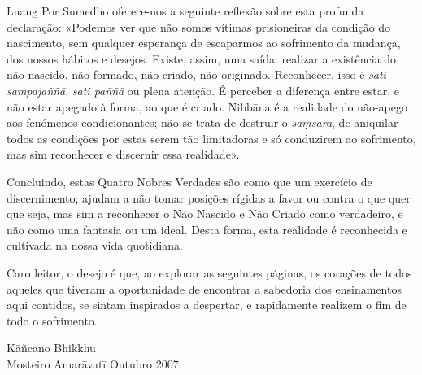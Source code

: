 Luang Por Sumedho oferece-nos a seguinte reflexão sobre esta profunda
declaração: «Podemos ver que não somos vítimas prisioneiras da condição do
nascimento, sem qualquer esperança de escaparmos ao sofrimento da mudança, dos
nossos hábitos e desejos. Existe, assim, uma saída: realizar a existência do não
nascido, não formado, não criado, não originado. Reconhecer, isso é \emph{sati
  sampajaññā}, \emph{sati paññā} ou plena atenção. É perceber a diferença entre
estar, e não estar apegado à forma, ao que é criado. Nibbāna é a realidade do
não-apego aos fenómenos condicionantes; não se trata de destruir o
\emph{saṃsāra}, de aniquilar todos as condições por estas serem tão limitadoras
e só conduzirem ao sofrimento, mas sim reconhecer e discernir essa realidade».

Concluindo, estas Quatro Nobres Verdades são como que um exercício de
discernimento; ajudam a não tomar posições rígidas a favor ou contra o que quer
que seja, mas sim a reconhecer o Não Nascido e Não Criado como verdadeiro, e não
como uma fantasia ou um ideal. Desta forma, esta realidade é reconhecida e
cultivada na nossa vida quotidiana.

\bigskip

Caro leitor, o desejo é que, ao explorar as seguintes páginas, os corações de todos aqueles que tiveram a oportunidade
de encontrar a sabedoria dos ensinamentos aqui contidos, se
sintam inspirados a despertar, e rapidamente realizem o fim
de todo o sofrimento.

\bigskip

{\raggedleft
  Kāñcano Bhikkhu\\
  Mosteiro Amarāvatī
  Outubro 2007
\par}

